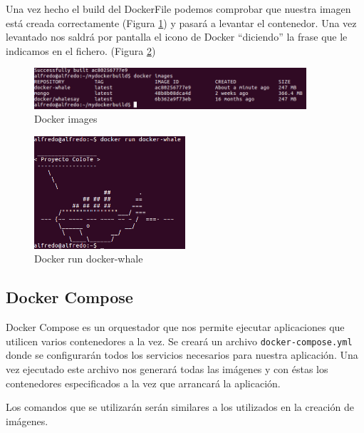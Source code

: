 Una vez hecho el build del DockerFile podemos comprobar que nuestra imagen está creada correctamente (Figura \ref{Imag:ImageWhale}) y pasará a levantar el contenedor. Una vez levantado nos saldrá por pantalla el icono de Docker “diciendo” la frase que le indicamos en el fichero. (Figura \ref{Run:RunWhale}) 

\begin{figure}[htb]
\begin{center}
\includegraphics[width=0.90\textwidth]{./setup/DockerImagesWhale}
\caption{Docker images}
\label{Imag:ImageWhale}
\end{center}
\end{figure}
\pagebreak

\begin{figure}[htb]
\begin{center}
\includegraphics[width=0.50\textwidth]{./setup/DockerRunWhale}
\caption{Docker run docker-whale}
\label{Run:RunWhale}
\end{center}
\end{figure}

\subsection{Docker Compose}

Docker Compose es un orquestador que nos permite ejecutar aplicaciones que utilicen varios contenedores a la vez. Se creará un archivo \texttt{docker-compose.yml} donde se configurarán todos los servicios necesarios para nuestra aplicación. Una vez ejecutado este archivo nos generará todas las imágenes y con éstas los contenedores especificados a la vez que arrancará la aplicación.

Los comandos que se utilizarán serán similares a los utilizados en la creación de imágenes.

